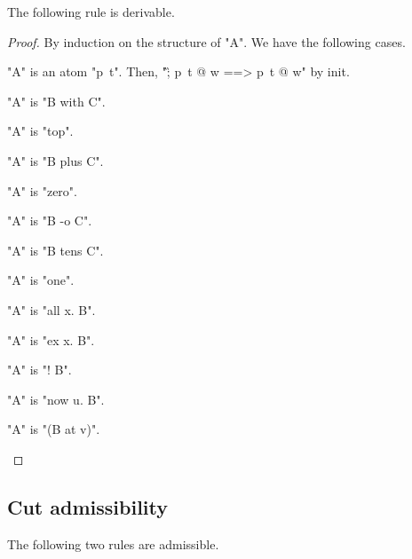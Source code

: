 \documentclass{article}
\begin{document}
\begin{lem}
\begin{thm} The following rule is derivable.
  
\end{thm}

\begin{proof}
  By induction on the structure of "A". We have the following cases.
  \begin{ecom}  
  \item "A" is an atom "p~\vec t". Then, "\G ; p~\vec t @ w ==> p~\vec t @ w" by init.
  \item "A" is "B with C".
    
  \item "A" is "top".
    
  \item "A" is "B plus C".
    
  \item "A" is "zero".
    
  \item "A" is "B -o C".
    
  \item "A" is "B tens C".
    
  \item "A" is "one".
    
  \item "A" is "all x. B".
    
  \item "A" is "ex x. B".
    
  \item "A" is "! B".
    
  \item "A" is "now u. B".
    
  \item "A" is "(B at v)".
    
  \end{ecom}
\end{proof}

\subsection{Cut admissibility}
\label{sec:proofs.cut}

\begin{thm} The following two rules are admissible.
  
\end{thm}


\end{lem}
\end{document}
